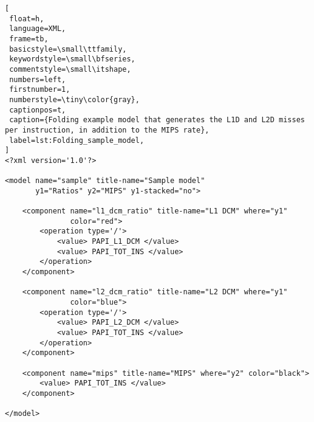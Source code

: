 \begin{lstlisting}[
 float=h,
 language=XML,
 frame=tb,
 basicstyle=\small\ttfamily,
 keywordstyle=\small\bfseries,
 commentstyle=\small\itshape,
 numbers=left,
 firstnumber=1,
 numberstyle=\tiny\color{gray},
 captionpos=t,
 caption={Folding example model that generates the L1D and L2D misses per instruction, in addition to the MIPS rate},
 label=lst:Folding_sample_model,
]
<?xml version='1.0'?>

<model name="sample" title-name="Sample model"
       y1="Ratios" y2="MIPS" y1-stacked="no">

    <component name="l1_dcm_ratio" title-name="L1 DCM" where="y1"
               color="red">
        <operation type='/'>
            <value> PAPI_L1_DCM </value>
            <value> PAPI_TOT_INS </value>
        </operation>
    </component>

    <component name="l2_dcm_ratio" title-name="L2 DCM" where="y1"
               color="blue">
        <operation type='/'>
            <value> PAPI_L2_DCM </value>
            <value> PAPI_TOT_INS </value>
        </operation>
    </component>

    <component name="mips" title-name="MIPS" where="y2" color="black">
        <value> PAPI_TOT_INS </value>
    </component>

</model>
\end{lstlisting}
